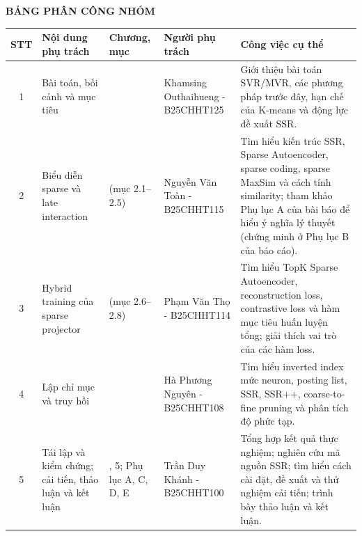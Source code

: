 \documentclass[a4paper,13pt]{extreport}
\newcommand{\ThanhVienA}{Nguyễn Văn Toàn - B25CHHT115}
\newcommand{\ThanhVienB}{Phạm Văn Thọ - B25CHHT114}
\newcommand{\ThanhVienC}{Hà Phương Nguyên - B25CHHT108}
\newcommand{\ThanhVienD}{Trần Duy Khánh - B25CHHT100}
\newcommand{\ThanhVienE}{Khamsing Outhaihueng - B25CHHT125}
\theoremstyle{plain}
\begin{document}
\begin{center}
{\bfseries BẢNG PHÂN CÔNG NHÓM}
\end{center}
{\small
\begin{tabularx}{\textwidth}{|c|>{\raggedright\arraybackslash}p{2.9cm}|>{\centering\arraybackslash}p{1.7cm}|>{\raggedright\arraybackslash}p{2.8cm}|>{\raggedright\arraybackslash}X|}
\hline
\textbf{STT} & \textbf{Nội dung phụ trách} & \textbf{Chương, mục} & \textbf{Người phụ trách} & \textbf{Công việc cụ thể}\\
\hline
1 & Bài toán, bối cảnh và mục tiêu & 1 & \ThanhVienE & Giới thiệu bài toán SVR/MVR, các phương pháp trước đây, hạn chế của K-means và động lực đề xuất SSR.\\
\hline
2 & Biểu diễn sparse và late interaction & 2 (mục 2.1--2.5) & \ThanhVienA & Tìm hiểu kiến trúc SSR, Sparse Autoencoder, sparse coding, sparse MaxSim và cách tính similarity; tham khảo Phụ lục A của bài báo để hiểu ý nghĩa lý thuyết (chứng minh ở Phụ lục B của báo cáo).\\
\hline
3 & Hybrid training của sparse projector & 2 (mục 2.6--2.8) & \ThanhVienB & Tìm hiểu TopK Sparse Autoencoder, reconstruction loss, contrastive loss và hàm mục tiêu huấn luyện tổng; giải thích vai trò của các hàm loss.\\
\hline
4 & Lập chỉ mục và truy hồi & 3 & \ThanhVienC & Tìm hiểu inverted index mức neuron, posting list, SSR, SSR++, coarse-to-fine pruning và phân tích độ phức tạp.\\
\hline
5 & Tái lập và kiểm chứng; cải tiến, thảo luận và kết luận & 4, 5; Phụ lục A, C, D, E & \ThanhVienD & Tổng hợp kết quả thực nghiệm; nghiên cứu mã nguồn SSR; tìm hiểu cách cài đặt, đề xuất và thử nghiệm cải tiến; trình bày thảo luận và kết luận.\\
\hline
\end{tabularx}}
\end{document}
